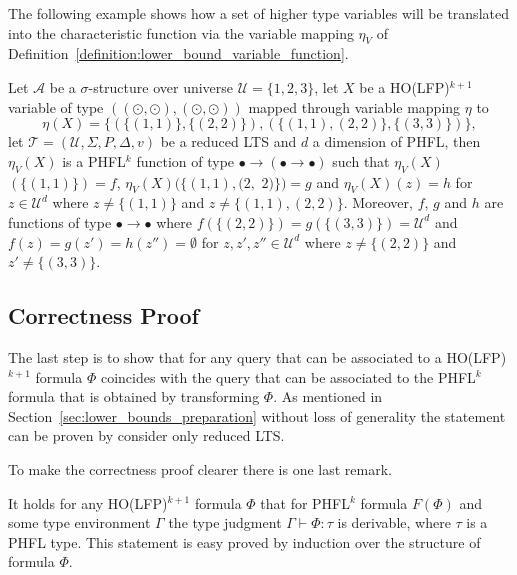 The following example shows how a set of higher type variables will be translated into the characteristic function via the
variable mapping $\eta_V$ of Definition~\ref{definition:lower_bound_variable_function}.

\begin{example}
    Let $\mathcal{A}$ be a $\sigma$-structure over universe $\mathcal{U} = \{1, 2, 3\}$, let $X$ be a HO(LFP)$^{k + 1}$
    variable of type $((\odot, \odot), (\odot, \odot))$ mapped through variable mapping $\eta$ to
    \[\eta(X) = \{(\{(1, 1)\}, \{(2, 2)\}), (\{(1, 1), (2, 2)\}, \{(3, 3)\})\},\]
    let $\mathcal{T} = (\mathcal{U}, \Sigma, P, \Delta, v)$ be a reduced LTS and $d$ a dimension of PHFL, then $\eta_V(X)$ is a PHFL$^k$ function of type $\bullet \rightarrow (\bullet \rightarrow \bullet)$ such
    that $\eta_V(X)$ $(\{(1, 1)\}) = f$, $\eta_V(X)(\{(1, 1), (2, $ $2)\}) = g$ and $\eta_V(X)(z) = h$ for $z \in
    \mathcal{U}^d$ where $z \neq \{(1, 1)\}$ and $z \neq \{(1, 1), (2, 2)\}$. Moreover, $f$, $g$ and $h$ are functions of type $\bullet
    \rightarrow \bullet$ where $f(\{(2, 2)\}) = g(\{(3, 3)\}) = \mathcal{U}^d$ and $f(z) = g(z') = h(z'') = \emptyset$ for $z,
    z', z'' \in \mathcal{U}^d$ where $z \neq \{(2, 2)\}$ and $z' \neq \{(3, 3)\}$.
\end{example}

\subsection{Correctness Proof}\label{subsec:lower_bounds_correctness_lfp}

The last step is to show that for any query that can be associated to a HO(LFP)$^{k+1}$ formula $\Phi$ coincides with the query that can be associated to the PHFL$^k$ formula that is obtained by transforming $\Phi$. As mentioned in Section~\ref{sec:lower_bounds_preparation} without loss of generality the statement can be proven by consider only  reduced LTS. 

To make the correctness proof clearer there is one last remark.

\begin{remark}
    It holds for any HO(LFP)$^{k+1}$ formula $\Phi$ that for PHFL$^k$ formula $F(\Phi)$ and some type environment $\Gamma$ the type judgment $\Gamma \vdash
    \Phi \colon \tau$ is derivable, where $\tau$ is a PHFL type. This statement
    is easy proved by induction over the structure of formula $\Phi$. 
\end{remark}

